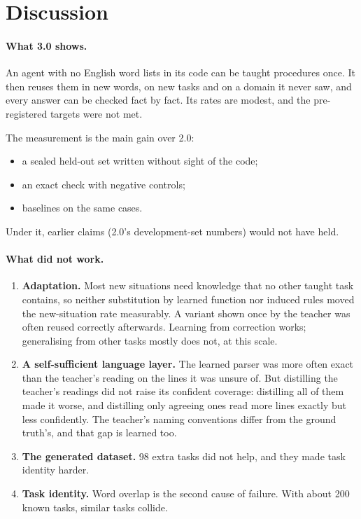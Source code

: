\section{Discussion}

\paragraph{What 3.0 shows.} An agent with no English word lists in its code can be taught procedures once. It then reuses them in new words, on new tasks and on a domain it never saw, and every answer can be checked fact by fact. Its rates are modest, and the pre-registered targets were not met.

The measurement is the main gain over 2.0:
\begin{itemize}
  \item a sealed held-out set written without sight of the code;
  \item an exact check with negative controls;
  \item baselines on the same cases.
\end{itemize}
Under it, earlier claims (2.0's development-set numbers) would not have held.

\paragraph{What did not work.}
\begin{enumerate}
  \item \textbf{Adaptation.} Most new situations need knowledge that no other taught task contains, so neither substitution by learned function nor induced rules moved the new-situation rate measurably. A variant shown once by the teacher was often reused correctly afterwards. Learning from correction works; generalising from other tasks mostly does not, at this scale.
  \item \textbf{A self-sufficient language layer.} The learned parser was more often exact than the teacher's reading on the lines it was unsure of. But distilling the teacher's readings did not raise its confident coverage: distilling all of them made it worse, and distilling only agreeing ones read more lines exactly but less confidently. The teacher's naming conventions differ from the ground truth's, and that gap is learned too.
  \item \textbf{The generated dataset.} 98 extra tasks did not help, and they made task identity harder.
  \item \textbf{Task identity.} Word overlap is the second cause of failure. With about 200 known tasks, similar tasks collide.
\end{enumerate}

